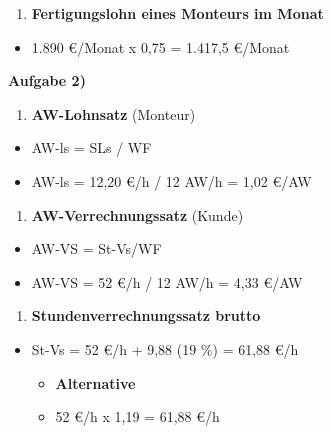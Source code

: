 \begin{enumerate}
\def\labelenumi{\alph{enumi})}
\setcounter{enumi}{5}
\item
  \textbf{Fertigungslohn eines Monteurs im Monat}
\end{enumerate}

\begin{itemize}
\item
  1.890 €/Monat x 0,75 = 1.417,5 €/Monat
\end{itemize}

\textbf{Aufgabe 2)}

\begin{enumerate}
\def\labelenumi{\alph{enumi})}
\item
  \textbf{AW-Lohnsatz} (Monteur)
\end{enumerate}

\begin{itemize}
\item
  AW-ls = SLs / WF
\item
  AW-ls = 12,20 €/h / 12 AW/h = 1,02 €/AW
\end{itemize}

\begin{enumerate}
\def\labelenumi{\alph{enumi})}
\setcounter{enumi}{1}
\item
  \textbf{AW-Verrechnungssatz} (Kunde)
\end{enumerate}

\begin{itemize}
\item
  AW-VS = St-Vs/WF
\item
  AW-VS = 52 €/h / 12 AW/h = 4,33 €/AW
\end{itemize}

\begin{enumerate}
\def\labelenumi{\alph{enumi})}
\setcounter{enumi}{2}
\item
  \textbf{Stundenverrechnungssatz brutto}
\end{enumerate}

\begin{itemize}
\item
  St-Vs = 52 €/h + 9,88 (19 \%) = 61,88 €/h

  \begin{itemize}
  \item
    \textbf{Alternative}
  \item
    52 €/h x 1,19 = 61,88 €/h
  \end{itemize}
\end{itemize}

